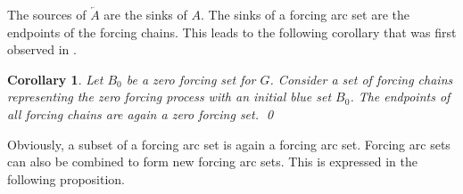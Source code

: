 \documentclass[12pt]{amsart}
\theoremstyle{plain}
\newtheorem{corollary}[theorem]{Corollary}
\theoremstyle{definition}
\begin{document}
The sources of $\overleftarrow{A}$ are the sinks of $A$. The sinks of a forcing arc set are the endpoints of the forcing chains. 
This leads to the following corollary that was first observed in \cite{barioli2010problems}.
\begin{corollary}
Let $B_0$ be a zero forcing set for $G$. Consider a set of forcing chains representing the zero forcing process with an initial blue set $B_0$. 
The endpoints of all forcing chains are again a zero forcing set. \hfill \qed
\end{corollary}



Obviously, a subset of a forcing arc set is again a forcing arc set. 
Forcing arc sets can also be combined to form new forcing arc sets. This is expressed in the following proposition.%
\end{document}
